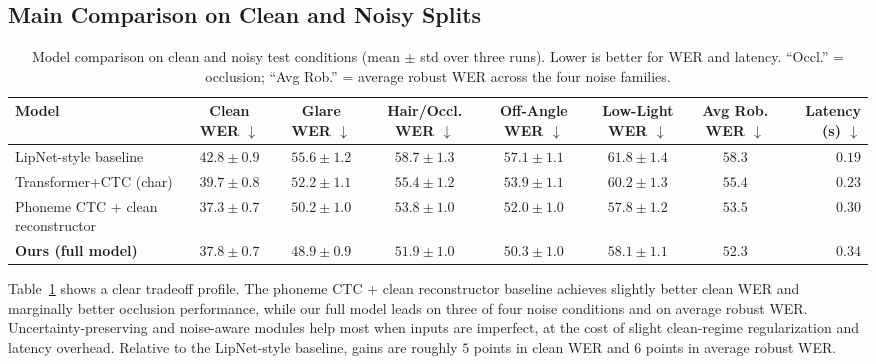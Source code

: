 \documentclass[10pt,twocolumn,letterpaper]{article}
\begin{document}
\subsection{Main Comparison on Clean and Noisy Splits}
\begin{table}[t]
\centering
\small
\caption{Model comparison on clean and noisy test conditions (mean $\pm$ std over three runs). Lower is better for WER and latency. ``Occl.'' = occlusion; ``Avg Rob.'' = average robust WER across the four noise families.}
\label{tab:noisy-comparison}
\setlength{\tabcolsep}{5pt}
\begin{tabular}{lccccccr}
\toprule
Model & \makecell{Clean\\WER $\downarrow$} & \makecell{Glare\\WER $\downarrow$} & \makecell{Hair/Occl.\\WER $\downarrow$} & \makecell{Off-Angle\\WER $\downarrow$} & \makecell{Low-Light\\WER $\downarrow$} & \makecell{Avg Rob.\\WER $\downarrow$} & \makecell{Latency\\(s) $\downarrow$} \\
\midrule
LipNet-style baseline             & $42.8 \pm 0.9$          & $55.6 \pm 1.2$          & $58.7 \pm 1.3$          & $57.1 \pm 1.1$          & $61.8 \pm 1.4$          & $58.3$          & $\mathbf{0.19}$ \\
Transformer+CTC (char)            & $39.7 \pm 0.8$          & $52.2 \pm 1.1$          & $55.4 \pm 1.2$          & $53.9 \pm 1.1$          & $60.2 \pm 1.3$          & $55.4$          & $0.23$ \\
Phoneme CTC + clean reconstructor & $\mathbf{37.3 \pm 0.7}$ & $50.2 \pm 1.0$          & $53.8 \pm 1.0$          & $52.0 \pm 1.0$          & $\mathbf{57.8 \pm 1.2}$ & $53.5$          & $0.30$ \\
\textbf{Ours (full model)}        & $37.8 \pm 0.7$          & $\mathbf{48.9 \pm 0.9}$ & $\mathbf{51.9 \pm 1.0}$ & $\mathbf{50.3 \pm 1.0}$ & $58.1 \pm 1.1$          & $\mathbf{52.3}$ & $0.34$ \\
\bottomrule
\end{tabular}
\end{table}

Table~\ref{tab:noisy-comparison} shows a clear tradeoff profile. The phoneme CTC + clean reconstructor baseline achieves slightly better clean WER and marginally better occlusion performance, while our full model leads on three of four noise conditions and on average robust WER. Uncertainty-preserving and noise-aware modules help most when inputs are imperfect, at the cost of slight clean-regime regularization and latency overhead. Relative to the LipNet-style baseline, gains are roughly $5$ points in clean WER and $6$ points in average robust WER.
\end{document}
